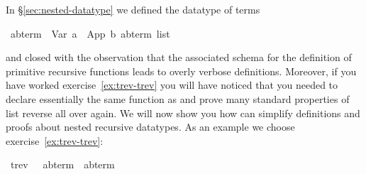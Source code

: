 %
\begin{isabellebody}%
\def\isabellecontext{Nested{\isadigit{0}}}%
%
\begin{isamarkuptext}%
In \S\ref{sec:nested-datatype} we defined the datatype of terms%
\end{isamarkuptext}%
\ {\isacharparenleft}{\isacharprime}a{\isacharcomma}{\isacharprime}b{\isacharparenright}{\isachardoublequote}term{\isachardoublequote}\ {\isacharequal}\ Var\ {\isacharprime}a\ {\isacharbar}\ App\ {\isacharprime}b\ {\isachardoublequote}{\isacharparenleft}{\isacharprime}a{\isacharcomma}{\isacharprime}b{\isacharparenright}term\ list{\isachardoublequote}%
\begin{isamarkuptext}%
\noindent
and closed with the observation that the associated schema for the definition
of primitive recursive functions leads to overly verbose definitions. Moreover,
if you have worked exercise~\ref{ex:trev-trev} you will have noticed that
you needed to declare essentially the same function as 
and prove many standard properties of list reverse all over again. 
We will now show you how  can simplify
definitions and proofs about nested recursive datatypes. As an example we
choose exercise~\ref{ex:trev-trev}:%
\end{isamarkuptext}%
\ trev\ \ {\isacharcolon}{\isacharcolon}\ {\isachardoublequote}{\isacharparenleft}{\isacharprime}a{\isacharcomma}{\isacharprime}b{\isacharparenright}term\ {\isasymRightarrow}\ {\isacharparenleft}{\isacharprime}a{\isacharcomma}{\isacharprime}b{\isacharparenright}term{\isachardoublequote}\end{isabellebody}%
